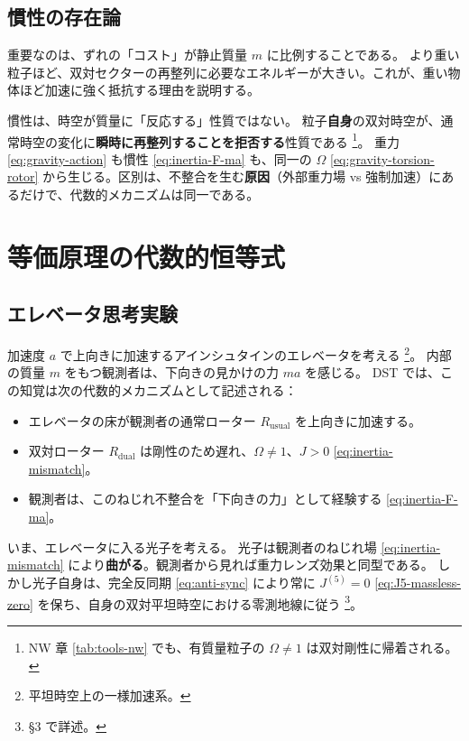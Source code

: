 \documentclass[dvipdfmx,a4paper,oneside]{jsbook}
\numberwithin{equation}{chapter}
\begin{document}
\subsection{慣性の存在論}

重要なのは、ずれの「コスト」が静止質量 \(m\) に比例することである。
より重い粒子ほど、双対セクターの再整列に必要なエネルギーが大きい。これが、重い物体ほど加速に強く抵抗する理由を説明する。

慣性は、時空が質量に「反応する」性質ではない。
粒子\textbf{自身}の双対時空が、通常時空の変化に\textbf{瞬時に再整列することを拒否する}性質である \footnote{NW 章 \eqref{tab:tools-nw} でも、有質量粒子の \(\Omega \neq 1\) は双対剛性に帰着される。}。
重力 \eqref{eq:gravity-action} も慣性 \eqref{eq:inertia-F-ma} も、同一の \(\Omega\) \eqref{eq:gravity-torsion-rotor} から生じる。区別は、不整合を生む\textbf{原因}（外部重力場 vs 強制加速）にあるだけで、代数的メカニズムは同一である。

\section{等価原理の代数的恒等式}

\subsection{エレベータ思考実験}

加速度 \(a\) で上向きに加速するアインシュタインのエレベータを考える \footnote{平坦時空上の一様加速系。}。
内部の質量 \(m\) をもつ観測者は、下向きの見かけの力 \(ma\) を感じる。
DST では、この知覚は次の代数的メカニズムとして記述される：

\begin{itemize}[leftmargin=2em]
  \item エレベータの床が観測者の通常ローター \(R_{\mathrm{usual}}\) を上向きに加速する。
  \item 双対ローター \(R_{\mathrm{dual}}\) は剛性のため遅れ、\(\Omega \neq 1\)、\(J > 0\) \eqref{eq:inertia-mismatch}。
  \item 観測者は、このねじれ不整合を「下向きの力」として経験する \eqref{eq:inertia-F-ma}。
\end{itemize}

いま、エレベータに入る光子を考える。
光子は観測者のねじれ場 \eqref{eq:inertia-mismatch} により\textbf{曲がる}。観測者から見れば重力レンズ効果と同型である。
しかし光子自身は、完全反同期 \eqref{eq:anti-sync} により常に \(J^{(5)} = 0\) \eqref{eq:J5-massless-zero} を保ち、自身の双対平坦時空における零測地線に従う \footnote{§3 で詳述。}。
\end{document}
